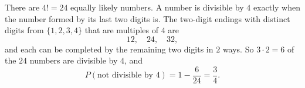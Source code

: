 There are $4!=24$ equally likely numbers. A number is divisible by $4$ exactly when the number formed by its last two digits is. The two-digit endings with distinct digits from $\{1,2,3,4\}$ that are multiples of $4$ are
\[
12,\quad 24,\quad 32,
\]
and each can be completed by the remaining two digits in $2$ ways. So $3\cdot2=6$ of the $24$ numbers are divisible by $4$, and
\[
P(\text{not divisible by }4)=1-\dfrac{6}{24}=\boxed{\dfrac{3}{4}}.
\]
